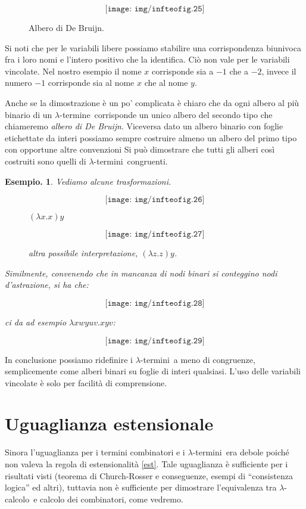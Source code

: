 \documentclass{book}
\newtheorem{esempio}{Esempio.}
\newcommand*{\lbc}{$\lambda$-cal\-co\-lo}
\newcommand*{\lbt}{$\lambda$-ter\-mi\-ne}
\newcommand*{\lbts}{$\lambda$-ter\-mi\-ni}
\begin{document}
\begin{figure}[!ht]
\[\texttt{[image: img/infteofig.25]}\]
\caption{Albero di De Bruijn.}
\end{figure}

Si noti che per le variabili libere possiamo stabilire una corrispondenza 
biunivoca fra i loro nomi e l'intero positivo che la identifica. Ci\`o non vale
per le variabili vincolate. Nel nostro esempio il nome $x$ corrisponde sia a
$-1$ che a $-2$, invece il numero $-1$ corrisponde sia al nome $x$ che al nome
$y$.

Anche se la dimostrazione \`e un po' complicata \`e chiaro che da ogni albero 
al pi\`u binario di un \lbt~corrisponde un unico albero del secondo tipo che
chiameremo \emph{albero di De Bruijn}. Viceversa dato un albero binario con
foglie etichettate da interi  possiamo sempre costruire almeno un albero del
primo tipo con opportune altre convenzioni Si pu\`o dimostrare che tutti gli 
alberi cos\`i costruiti sono quelli di \lbts~congruenti.

\begin{esempio}Vediamo alcune trasformazioni.
\begin{figure}[!ht]
\[\texttt{[image: img/infteofig.26]}\]
\caption{$(\lambda x.x)y$}
\end{figure}
\begin{figure}[!ht]
\[ \texttt{[image: img/infteofig.27]} \]
\caption{altra possibile interpretazione, $(\lambda z.z)y$.}
\end{figure}

Similmente, convenendo che in mancanza di nodi binari si conteggino nodi 
d'astrazione, si ha che:

\[ \texttt{[image: img/infteofig.28]} \]

ci da ad esempio $\lambda xwyuv.xyv$:


\[ \texttt{[image: img/infteofig.29]} \]

\end{esempio}

In conclusione possiamo ridefinire i \lbts~a meno di congruenze, semplicemente
come alberi binari su foglie di interi qualsiasi. L'uso delle variabili
vincolate \`e solo per facilit\`a di comprensione.

\section{Uguaglianza estensionale}
Sinora l'uguaglianza per i termini combinatori e i \lbts~era debole poich\'e
non valeva la regola di estensionalit\`a \ref{est}. Tale uguaglianza \`e 
sufficiente per i risultati visti (teorema di Church-Rosser e conseguenze,
esempi di ``consistenza logica'' ed altri), tuttavia non \`e sufficiente per 
dimostrare l'equivalenza tra \lbc~e calcolo dei combinatori, come vedremo.
\end{document}
